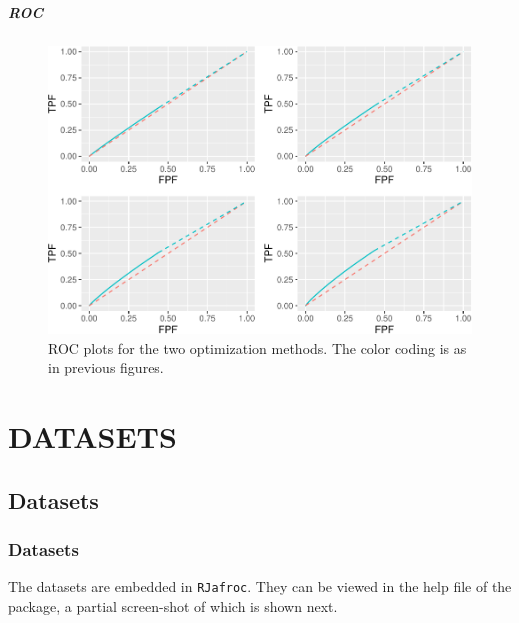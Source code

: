 \documentclass[
]{book}
\begin{document}
\hypertarget{roc-10}{%
\subsubsection{ROC}\label{roc-10}}

\begin{figure}
\centering
\includegraphics{22-optim-op-point_files/figure-latex/optim-op-point-low-performance-vary-nu-vary-all-roc-1.pdf}
\caption{\label{fig:optim-op-point-low-performance-vary-nu-vary-all-roc}ROC plots for the two optimization methods. The color coding is as in previous figures.}
\end{figure}

\hypertarget{part-datasets}{%
\part*{DATASETS}\label{part-datasets}}

\hypertarget{datasets}{%
\chapter{Datasets}\label{datasets}}

\hypertarget{datasets-datasets}{%
\section{Datasets}\label{datasets-datasets}}

The datasets are embedded in \texttt{RJafroc}. They can be viewed in the help file of the package, a partial screen-shot of which is shown next.
\end{document}
